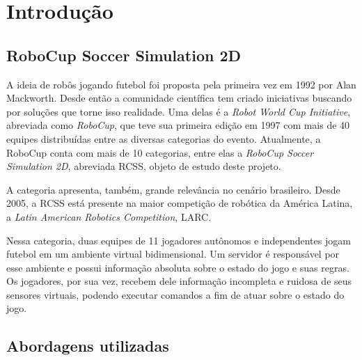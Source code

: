 
\chapter{Introdução}

\label{CapIntro}



\section{RoboCup Soccer Simulation 2D}
\par A ideia de robôs jogando futebol foi proposta pela primeira vez em 1992 por Alan Mackworth\cite{}. 
Desde então a comunidade científica tem criado iniciativas buscando por soluções que torne isso realidade.
Uma delas é a \textit{Robot World Cup Initiative}, abreviada como \textit{RoboCup}, que teve sua primeira edição em 1997 com mais de 40 equipes distribuídas entre as diversas categorias do evento.
Atualmente, a RoboCup conta com mais de 10 categorias, entre elas a \textit{RoboCup Soccer Simulation 2D}, abreviada RCSS, objeto de estudo deste projeto. 
\par A categoria apresenta, também, grande relevância no cenário brasileiro. 
Desde 2005, a RCSS está presente na maior competição de robótica da América Latina, a \textit{Latin American Robotics Competition}, LARC.
\par Nessa categoria, duas equipes de 11 jogadores autônomos e independentes jogam futebol em um ambiente virtual bidimensional. 
Um servidor é responsável por esse ambiente e possui informação absoluta sobre o estado do jogo e suas regras.
Os jogadores, por sua vez, recebem dele informação incompleta e ruidosa de seus sensores virtuais, podendo executar comandos a fim de atuar sobre o estado do jogo.
 


\section{Abordagens utilizadas}

\par  